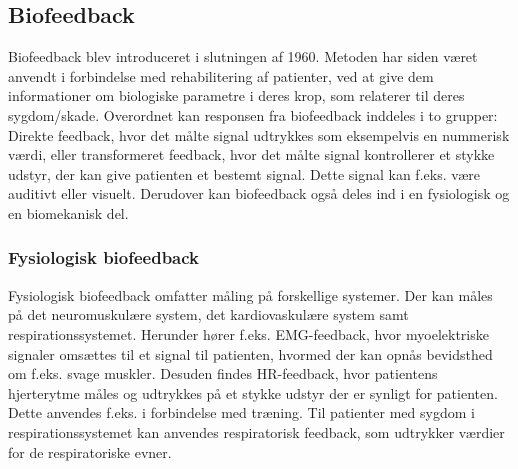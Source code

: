 \subsection{Biofeedback}
Biofeedback blev introduceret i slutningen af 1960. Metoden har siden været anvendt i forbindelse med rehabilitering af patienter, ved at give dem informationer om biologiske parametre i deres krop, som relaterer til deres sygdom/skade. 
Overordnet kan responsen fra biofeedback inddeles i to grupper: Direkte feedback, hvor det målte signal udtrykkes som eksempelvis en nummerisk værdi, eller transformeret feedback, hvor det målte signal kontrollerer et stykke udstyr, der kan give patienten et bestemt signal. Dette signal kan f.eks. være auditivt eller visuelt.
Derudover kan biofeedback også deles ind i en fysiologisk og en biomekanisk del.\cite{Giggins2013}

\subsubsection{Fysiologisk biofeedback}
Fysiologisk biofeedback omfatter måling på forskellige systemer. Der kan måles på det neuromuskulære system, det kardiovaskulære system samt respirationssystemet. 
Herunder hører f.eks. EMG-feedback, hvor myoelektriske signaler omsættes til et signal til patienten, hvormed der kan opnås bevidsthed om f.eks. svage muskler. Desuden findes HR-feedback, hvor patientens hjerterytme måles og udtrykkes på et stykke udstyr der er synligt for patienten. Dette anvendes f.eks. i forbindelse med træning. Til patienter med sygdom i respirationssystemet kan anvendes respiratorisk feedback, som udtrykker værdier for de respiratoriske evner.\cite{Giggins2013}

